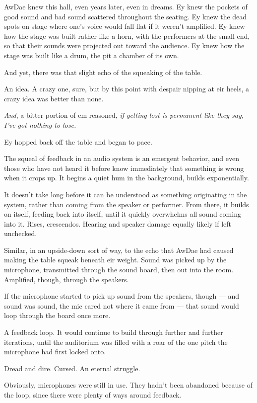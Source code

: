 AwDae knew this hall, even years later, even in dreams. Ey knew the pockets of good sound and bad sound scattered throughout the seating. Ey knew the dead spots on stage where one's voice would fall flat if it weren't amplified. Ey knew how the stage was built rather like a horn, with the performers at the small end, so that their sounds were projected out toward the audience. Ey knew how the stage was built like a drum, the pit a chamber of its own.

And yet, there was that slight echo of the squeaking of the table.

An idea. A crazy one, sure, but by this point with despair nipping at eir heels, a crazy idea was better than none.

\emph{And}, a bitter portion of em reasoned, \emph{if getting lost is permanent like they say, I've got nothing to lose.}

Ey hopped back off the table and began to pace.

The squeal of feedback in an audio system is an emergent behavior, and even those who have not heard it before know immediately that something is wrong when it crops up. It begins a quiet hum in the background, builds exponentially.

It doesn't take long before it can be understood as something originating in the system, rather than coming from the speaker or performer. From there, it builds on itself, feeding back into itself, until it quickly overwhelms all sound coming into it. Rises, crescendos. Hearing and speaker damage equally likely if left unchecked.

Similar, in an upside-down sort of way, to the echo that AwDae had caused making the table squeak beneath eir weight. Sound was picked up by the microphone, transmitted through the sound board, then out into the room. Amplified, though, through the speakers.

If the microphone started to pick up sound from the speakers, though --- and sound was sound, the mic cared not where it came from --- that sound would loop through the board once more.

A feedback loop. It would continue to build through further and further iterations, until the auditorium was filled with a roar of the one pitch the microphone had first locked onto.

Dread and dire. Cursed. An eternal struggle.

Obviously, microphones were still in use. They hadn't been abandoned because of the loop, since there were plenty of ways around feedback.

